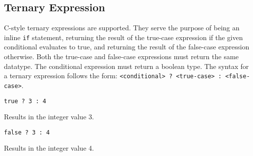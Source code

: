 
\subsection{Ternary Expression}
{
	C-style ternary expressions are supported.
	They serve the purpose of being an inline \texttt{if}
	statement, returning the result of the true-case expression
	if the given conditional evaluates to true, and returning the result
	of the false-case expression otherwise.
	Both the true-case and false-case expressions must return the same
	datatype. The conditional expression must return a boolean type.
	The syntax for a ternary expression follows the
	form: \texttt{<conditional> ? <true-case> : <false-case>}.
	
	\begin{itemize}
	{
		\item[] \lstinline[language=MAIA, columns=fixed]@true ? 3 : 4@
		
			Results in the integer value 3.
		
		\item[] \lstinline[language=MAIA, columns=fixed]@false ? 3 : 4@
		
			Results in the integer value 4.
	}
	\end{itemize}
}
